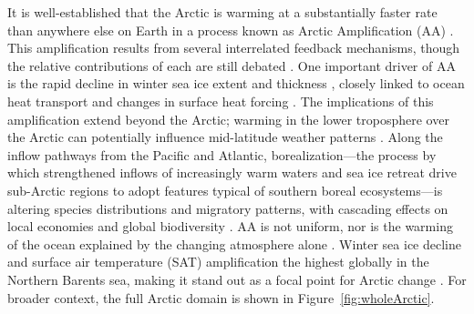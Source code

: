 \documentclass[draft]{agujournal2019}
\begin{document}
It is well-established that the Arctic is warming at a substantially faster rate than anywhere else on Earth in a process known as Arctic Amplification (AA) \cite{Manabe1980,Serreze2009,Cosimo2014,Huang2017,Rantanen2022}. This amplification results from several interrelated feedback mechanisms, though the relative contributions of each are still debated \cite{Pithan2014,Timmermans2018,Gong2017,Pistone2019,Previdi2021}. One important driver of AA is the rapid decline in winter sea ice extent and thickness \cite{Perovich2009,Dai2019}, closely linked to ocean heat transport and changes in surface heat forcing \cite{Onarheim2018,Stroeve2018,Oldenburg2024}. The implications of this amplification extend beyond the Arctic; warming in the lower troposphere over the Arctic can potentially influence mid-latitude weather patterns \cite{Honda2009,Petoukhov2010,Francis2012,Cohen2018,Coumou2018}. Along the inflow pathways from the Pacific and Atlantic, borealization—the process by which strengthened inflows of increasingly warm waters and sea ice retreat drive sub-Arctic regions to adopt features typical of southern boreal ecosystems—is altering species distributions and migratory patterns, with cascading effects on local economies and global biodiversity \cite{Fossheim2015,Polyakov2020_borealization,Ingvaldsen2021,Husson2024}. AA is not uniform, nor is the warming of the ocean explained by the changing atmosphere alone \cite{Marshall2014}. Winter sea ice decline and surface air temperature (SAT) amplification the highest globally in the Northern Barents sea, making it stand out as a focal point for Arctic change \cite{Screen2010,Onarheim2017,Isaksen2022,Rantanen2022}. For broader context, the full Arctic domain is shown in Figure~\ref{fig:wholeArctic}.
\end{document}
